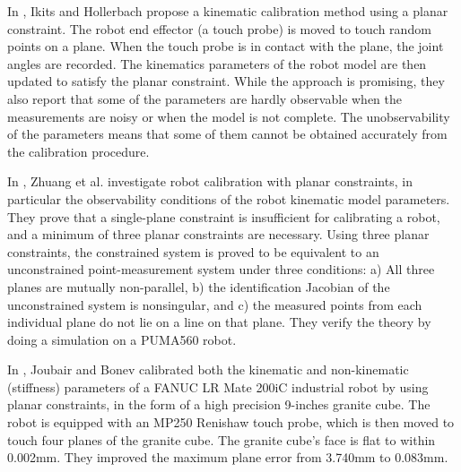 In \cite{Ikits1997}, Ikits and Hollerbach propose a kinematic calibration method using a planar constraint. The robot end effector (a touch probe) is moved to touch random points on a plane. When the touch probe is in contact with the plane, the joint angles are recorded. The kinematics parameters of the robot model are then updated to satisfy the planar constraint. While the approach is promising, they also report that some of the parameters are hardly observable when the measurements are noisy or when the model is not complete. The unobservability of the parameters means that some of them cannot be obtained accurately from the calibration procedure.

In \cite{Zhuang1999}, Zhuang et al. investigate robot calibration with planar constraints, in particular the observability conditions of the robot kinematic model parameters. They prove that a single-plane constraint is insufficient for calibrating a robot, and a minimum of three planar constraints are necessary. Using three planar constraints, the constrained system is proved to be equivalent to an unconstrained point-measurement system under three conditions: a) All three planes are mutually non-parallel, b) the identification Jacobian of the unconstrained system is nonsingular, and c) the measured points from each individual plane do not lie on a line on that plane. They verify the theory by doing a simulation on a PUMA560 robot. 

In \cite{Joubair2015}, Joubair and Bonev calibrated both the kinematic and non-kinematic (stiffness) parameters of a FANUC LR Mate 200iC industrial robot by using planar constraints, in the form of a high precision 9-inches granite cube. The robot is equipped with an MP250 Renishaw touch probe, which is then moved to touch four planes of the granite cube. The granite cube's face is flat to within 0.002mm. They improved the maximum plane error from 3.740mm to 0.083mm. 

